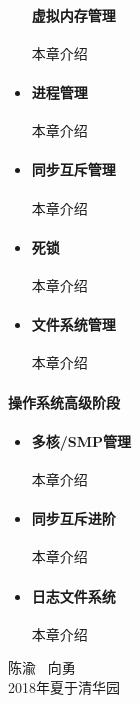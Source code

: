 \documentclass{zhbook}
\begin{document}
\begin{preface}
\begin{itemize}
	\paragraph{虚拟内存管理}本章介绍	
	\item
	\paragraph{进程管理}本章介绍
	\item
	\paragraph{同步互斥管理}本章介绍
	\item
	\paragraph{死锁}本章介绍					
	\item
	\paragraph{文件系统管理}本章介绍		
\end{itemize}	

\paragraph{操作系统高级阶段}
\begin{itemize}
	\item
	\paragraph{多核/SMP管理}本章介绍	
	\item
	\paragraph{同步互斥进阶}本章介绍	
	\item
	\paragraph{日志文件系统}本章介绍		
\end{itemize}

\vspace{1cm}
\begin{flushright}
陈渝 \ 向勇\\
2018年夏于清华园
\end{flushright}

\end{preface}
\end{document}
